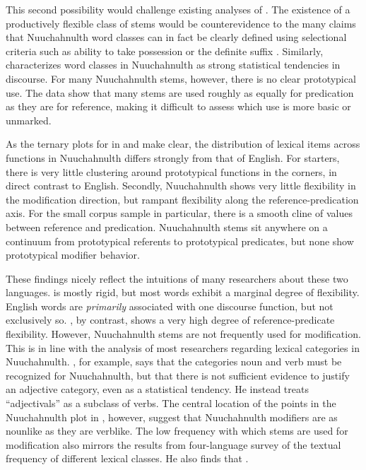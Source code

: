 This second possibility would challenge existing analyses of . The existence of a productively flexible class of stems would be counterevidence to the many claims that Nuuchahnulth word classes can in fact be clearly defined using selectional criteria such as ability to take possession or the definite suffix \parencites{Jacobsen1979}{DavisGillonMatthewson2014}{Braithwaite2015}. Similarly, \textcite[57]{Nakayama2001} characterizes word classes in Nuuchahnulth as strong statistical tendencies in discourse. For many Nuuchahnulth stems, however, there is no clear prototypical use. The data show that many stems are used roughly as equally for predication as they are for reference, making it difficult to assess which use is more basic or unmarked.

As the ternary plots for  in  and  make clear, the distribution of lexical items across functions in Nuuchahnulth differs strongly from that of English. For starters, there is very little clustering around prototypical functions in the corners, in direct contrast to English. Secondly, Nuuchahnulth shows very little flexibility in the modification direction, but rampant flexibility along the reference-predication axis. For the small corpus sample in particular, there is a smooth cline of values between reference and predication. Nuuchahnulth stems sit anywhere on a continuum from prototypical referents to prototypical predicates, but none show prototypical modifier behavior.

These findings nicely reflect the intuitions of many researchers about these two languages.  is mostly rigid, but most words exhibit a marginal degree of flexibility. English words are \emph{primarily} associated with one discourse function, but not exclusively so. , by contrast, shows a very high degree of reference-predicate flexibility. However, Nuuchahnulth stems are not frequently used for modification. This is in line with the analysis of most researchers regarding lexical categories in Nuuchahnulth. \textcite[50]{Nakayama2001}, for example, says that the categories noun and verb must be recognized for Nuuchahnulth, but that there is not sufficient evidence to justify an adjective category, even as a statistical tendency. He instead treats \enquote{adjectivals} as a subclass of verbs. The central location of the points in the Nuuchahnulth plot in , however, suggest that Nuuchahnulth modifiers are as nounlike as they are verblike. The low frequency with which stems are used for modification also mirrors the results from  four-language survey of the textual frequency of different lexical classes. He also finds that .

